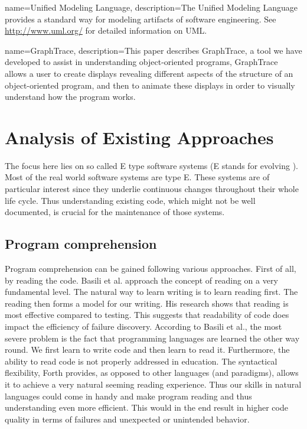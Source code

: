 {
  name={Unified Modeling Language},
  description={The Unified Modeling Language provides a standard way for modeling artifacts of software engineering. See \url{http://www.uml.org/} for detailed information on UML.}
}

{
  name={GraphTrace},
  description={This paper describes GraphTrace, a tool we have developed to assist in understanding object-oriented programs, GraphTrace allows a user to create displays revealing different aspects of the structure of an object-oriented program, and then to animate these displays in order to visually understand how the program works.}
}

\chapter{Analysis of Existing Approaches}
\label{chap:StateOfTheArt}

The focus here lies on so called E type software systems (E stands for evolving \cite{Cook:2006:ESS:1115566.1115567}). Most of the real world software systems are type E. These systems are of particular interest since they underlie continuous changes throughout their whole life cycle. Thus understanding existing code, which might not be well documented, is crucial for the maintenance of those systems.

\section{Program comprehension}

Program comprehension can be gained following various approaches. First of all, by reading the code.
Basili et al.\cite{Basili:1997:EPR:257260.257262} approach the concept of reading on a very fundamental level. The natural way to learn writing is to learn reading first. The reading then forms a model for our writing.  His research shows that reading is most effective compared to testing. This suggests that readability of code does impact the efficiency of failure discovery. According to Basili et al., the most severe problem is the fact that programming languages are learned the other way round. We first learn to write code and then learn to read it. Furthermore, the ability to read code is not properly addressed in education. The syntactical flexibility, Forth provides, as opposed to other languages (and paradigms), allows it to achieve a very natural seeming reading experience. Thus our skills in natural languages could come in handy and make program reading and thus understanding even more efficient. This would in the end result in higher code quality in terms of failures and unexpected or unintended behavior.

